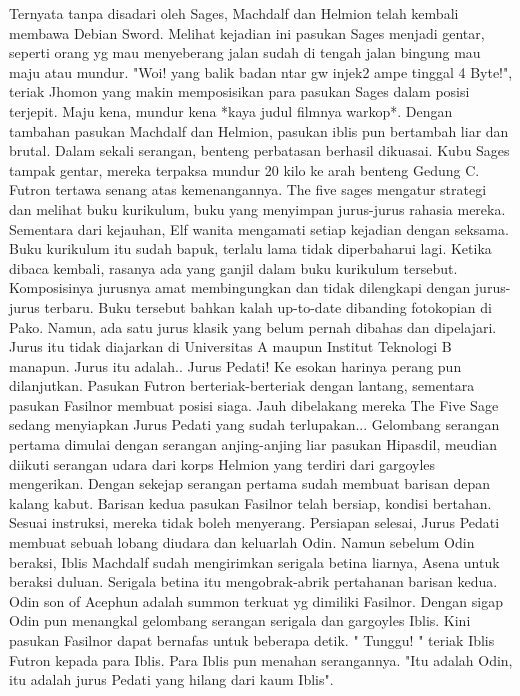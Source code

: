 \documentclass[a4paper,11pt,final]{article}
\begin{document}
Ternyata tanpa disadari oleh Sages, Machdalf dan Helmion telah kembali membawa Debian Sword. Melihat kejadian ini pasukan Sages menjadi gentar, seperti orang yg mau menyeberang jalan sudah di tengah jalan bingung mau maju atau mundur.
"Woi! yang balik badan ntar gw injek2 ampe tinggal 4 Byte!", teriak Jhomon yang makin memposisikan para pasukan Sages dalam posisi terjepit. Maju kena, mundur kena *kaya judul filmnya warkop*.
Dengan tambahan pasukan Machdalf dan Helmion, pasukan iblis pun bertambah liar dan brutal. Dalam sekali serangan, benteng perbatasan berhasil dikuasai. Kubu Sages tampak gentar, mereka terpaksa mundur 20 kilo ke arah benteng Gedung C.
Futron tertawa senang atas kemenangannya. The five sages mengatur strategi dan melihat buku kurikulum, buku yang menyimpan jurus-jurus rahasia mereka. Sementara dari kejauhan, Elf wanita mengamati setiap kejadian dengan seksama.
Buku kurikulum itu sudah bapuk, terlalu lama tidak diperbaharui lagi. Ketika dibaca kembali, rasanya ada yang ganjil dalam buku kurikulum tersebut. Komposisinya jurusnya amat membingungkan dan tidak dilengkapi dengan jurus-jurus terbaru.
Buku tersebut bahkan kalah up-to-date dibanding fotokopian di Pako.
Namun, ada satu jurus klasik yang belum pernah dibahas dan dipelajari. Jurus itu tidak diajarkan di Universitas A maupun Institut Teknologi B manapun. Jurus itu adalah..
Jurus Pedati!
Ke esokan harinya perang pun dilanjutkan. Pasukan Futron berteriak-berteriak dengan lantang, sementara pasukan Fasilnor membuat posisi siaga. Jauh dibelakang mereka The Five Sage sedang menyiapkan Jurus Pedati yang sudah terlupakan...
Gelombang serangan pertama dimulai dengan serangan anjing-anjing liar pasukan Hipasdil, meudian diikuti serangan udara dari korps Helmion yang terdiri dari gargoyles mengerikan. Dengan sekejap serangan pertama sudah membuat barisan depan kalang kabut.
Barisan kedua pasukan Fasilnor telah bersiap, kondisi bertahan. Sesuai instruksi, mereka tidak boleh menyerang. Persiapan selesai, Jurus Pedati membuat sebuah lobang diudara dan keluarlah Odin.
Namun sebelum Odin beraksi, Iblis Machdalf sudah mengirimkan serigala betina liarnya, Asena untuk beraksi duluan. Serigala betina itu mengobrak-abrik pertahanan barisan kedua.
Odin son of Acephun adalah summon terkuat yg dimiliki Fasilnor. Dengan sigap Odin pun menangkal gelombang serangan serigala dan gargoyles Iblis. Kini pasukan Fasilnor dapat bernafas untuk beberapa detik.
" Tunggu! " teriak Iblis Futron kepada para Iblis. Para Iblis pun menahan serangannya. "Itu adalah Odin, itu adalah jurus Pedati yang hilang dari kaum Iblis".
\end{document}
